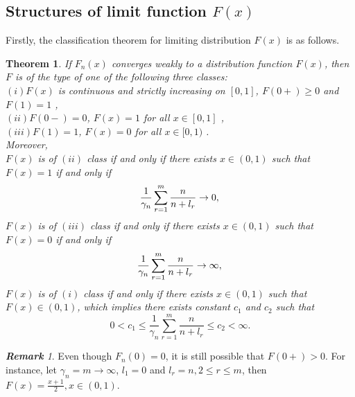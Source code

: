 \documentclass[12pt]{article}
\theoremstyle{plain}
\newtheorem{thm}{\textbf{Theorem}}
\theoremstyle{definition}
\theoremstyle{remark}
\newtheorem{rem}{\textbf{Remark}}
\begin{document}
 \noindent 
 
 \subsection{Structures of limit function $F(x)$}



Firstly, the classification theorem for limiting distribution $F(x)$ is as follows.

\begin{thm}\label{thm:classification}
	If $F_n(x)$ converges weakly to a distribution function $F(x)$, then $F$ is of the type of one of the following three classes:\\
	$(i)F(x)$ is continuous and strictly increasing on $[0,1]$, $F(0+)\geq0$ and $F(1)=1$ ,\\ 
	$(ii)F(0-)=0$, $F(x)=1$ for all $x\in [0,1]$ ,\\
	$(iii)F(1)=1$, $F(x)=0$ for all $x\in [0,1)$ .\\
	Moreover,\\
	$F(x) $ is of $(ii)$ class if and only if there exists $x\in (0,1)$ such that $F(x)=1$ if and only if
	\begin{equation*}
	\frac{1}{\gamma_{n}} \sum_{r=1}^{m} \frac{n}{n+l_{r}} \rightarrow 0,\\
	\end{equation*}
	$F(x) $ is of $(iii)$ class if and only if there exists $x\in (0,1)$ such that $F(x)=0$ if and only if
	\begin{equation*}
	\frac{1}{\gamma_{n}} \sum_{r=1}^{m} \frac{n}{n+l_{r}} \rightarrow \infty,\\
	\end{equation*}
	$F(x) $ is of $(i)$ class if and only if there exists $x\in (0,1)$ such that $F(x)\in (0,1)$, which implies there exists constant $c_1$ and $c_2$ such that 
	\begin{equation}
	0<c_{1} \leqslant \frac{1}{\gamma_{n}} \sum_{r=1}^{m} \frac{n}{n+l_{r}} \leqslant c_{2}<\infty.
	\end{equation}
\end{thm}
\begin{rem}\label{stange}
	Even though $F_n(0)=0$, it is still possible that $F(0+)>0$. For instance, let $\gamma_{n}=m\to \infty$, $ l_1=0$ and $l_r=n,2\leq r\leq m$, then $F(x)=\frac{x+1}{2}, x\in (0,1)$.
\end{rem}
\end{document}
